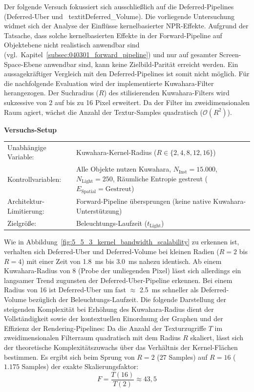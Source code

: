 Der folgende Versuch fokussiert sich ausschließlich auf die Deferred-Pipelines (Deferred-Uber und \
textit{Deferred\_Volume}).
Die vorliegende Untersuchung widmet sich der Analyse der Einflüsse kernelbasierter \ac{NPR}-Effekte.
Aufgrund der Tatsache, dass solche kernelbasierten Effekte in der Forward-Pipeline auf Objektebene nicht realistisch
anwendbar sind (vgl.\ Kapitel~\ref{subsec:040301_forward_pipeline}) und nur auf gesamter Screen-Space-Ebene anwendbar
sind, kann keine Zielbild-Parität erreicht werden.
Ein aussagekräftiger Vergleich mit den Deferred-Pipelines ist somit nicht möglich.
Für die nachfolgende Evaluation wird der implementierte Kuwahara-Filter herangezogen.
Der Suchradius ($R$) des stilisierenden Kuwahara-Filters wird sukzessive von 2 auf bis zu 16 Pixel erweitert.
Da der Filter im zweidimensionalen Raum agiert, wächst die Anzahl der Textur-Samples quadratisch ($\mathcal{O}(R^2)$).

\begin{center}
    \small
    \colorbox{gray!5}{\parbox{0.95\textwidth}{
        \centering
        \vspace{2mm}
        {\sffamily\bfseries Versuchs-Setup} \\[1.5ex]
        \begin{tabularx}{0.9\textwidth}{>{\sffamily}l X}
            Unabhängige Variable:    & Kuwahara-Kernel-Radius ($R \in \{2, 4, 8, 12, 16\}$) \\
            Kontrollvariablen:       & Alle Objekte nutzen Kuwahara,
            $N_{\text{Inst}} = 15.000$, $N_{\text{Light}} = 250$,
            Räumliche Entropie gestreut ($E_{\text{Spatial}} = \text{Gestreut}$) \\
            Architektur-Limitierung: & Forward-Pipeline übersprungen (keine native Kuwahara-Unterstützung) \\
            Zielgröße:               & Beleuchtungs-Laufzeit ($t_{\text{Light}}$)
        \end{tabularx}
        \vspace{2mm}
    }}
\end{center}

Wie in Abbildung~\ref{fig:5_5_3_kernel_bandwidth_scalability} zu erkennen ist, verhalten sich Deferred-Uber
und Deferred-Volume bei kleinen Radien ($R = 2$ bis $R = 4$) mit einer Zeit von \qty{1,8}{\milli\second} bis
\qty{3,0}{\milli\second} nahezu identisch.
Ab einem Kuwahara-Radius von 8 (Probe der umliegenden Pixel) lässt sich allerdings ein langsamer Trend zugunsten der
Deferred-Uber-Pipeline erkennen.
Bei einem Radius von 16 ist Deferred-Uber um fast $\approx$ \qty{2,5}{\milli\second} schneller als
Deferred-Volume bezüglich der Beleuchtungs-Laufzeit.
Die folgende Darstellung der steigenden Komplexität bei Erhöhung des Kuwahara-Radius dient der Vollständigkeit sowie der
kontextuellen Einordnung der Graphen und der Effizienz der Rendering-Pipelines:
Da die Anzahl der Texturzugriffe $T$ im zweidimensionalen Filterraum quadratisch mit dem Radius $R$ skaliert, lässt sich
der theoretische Komplexitätszuwachs über das Verhältnis der Kernel-Flächen bestimmen.
Es ergibt sich beim Sprung von $R=2$ ($27$ Samples) auf $R=16$ ($1.175$ Samples) der exakte Skalierungsfaktor:
\[F = \frac{T(16)}{T(2)} \approx 43{,}5\]

